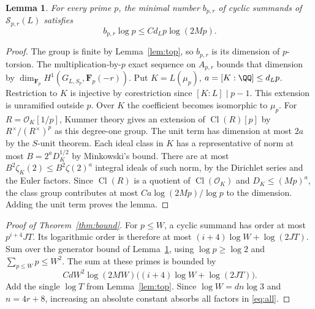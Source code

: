 \documentclass[a4paper,11pt]{article}
\newtheorem{lemma}[proposition]{Lemma}
\theoremstyle{definition}
\theoremstyle{remark}
\numberwithin{equation}{section}
\newcommand{\Sel}{\mathcal S}
\newcommand{\Cl}{\operatorname{Cl}}
\newcommand{\OO}{\mathcal O}
\begin{document}
\begin{lemma}\leavevmode\label{lem:rank}
For every prime \(p\), the minimal number \(b_{p,r}\) of cyclic summands of \(\Sel_{p,r}(L)\) satisfies
\[
 b_{p,r}\log p\le C d_L p\log(2Mp).
\]
\end{lemma}
\begin{proof}
The group is finite by Lemma~\ref{lem:top}, so \(b_{p,r}\) is its dimension of \(p\)-torsion. The multiplication-by-\(p\) exact sequence on \(A_{p,r}\) bounds that dimension by \(\dim_{\mathbf F_p} H^1(G_{L,S_p},\mathbf F_p(-r))\). Put \(K=L(\mu_p)\), \(a=[K:\QQ]\le d_Lp\). Restriction to \(K\) is injective by corestriction since \([K:L]\mid p-1\). This extension is unramified outside \(p\). Over \(K\) the coefficient becomes isomorphic to \(\mu_p\). For \(R=\OO_K[1/p]\), Kummer theory gives an extension of \(\Cl(R)[p]\) by \(R^\times/(R^\times)^p\) as this degree-one group. The unit term has dimension at most \(2a\) by the \(S\)-unit theorem. Each ideal class in \(K\) has a representative of norm at most \(B=2^aD_K^{1/2}\) by Minkowski's bound. There are at most \(B^2\zeta_K(2)\le B^2\zeta(2)^a\) integral ideals of such norm, by the Dirichlet series and the Euler factors. Since \(\Cl(R)\) is a quotient of \(\Cl(\OO_K)\) and \(D_K\le(Mp)^a\), the class group contributes at most \(Ca\log(2Mp)/\log p\) to the dimension. Adding the unit term proves the lemma.
\end{proof}

\begin{proof}[Proof of Theorem~\ref{thm:bound}]
For \(p\le W\), a cyclic summand has order at most \(p^{i+4}JT\). Its logarithmic order is therefore at most \((i+4)\log W+\log(2JT)\). Sum over the generator bound of Lemma~\ref{lem:rank}, using \(\log p\ge\log 2\) and \(\sum_{p\le W}p\le W^2\). The sum at these primes is bounded by
\[
 C d W^2\log(2MW)\big((i+4)\log W+\log(2JT)\big).
\]
Add the single \(\log T\) from Lemma~\ref{lem:top}. Since \(\log W=dn\log 3\) and \(n=4r+8\), increasing an absolute constant absorbs all factors in \eqref{eq:all}.
\end{proof}
\end{document}
